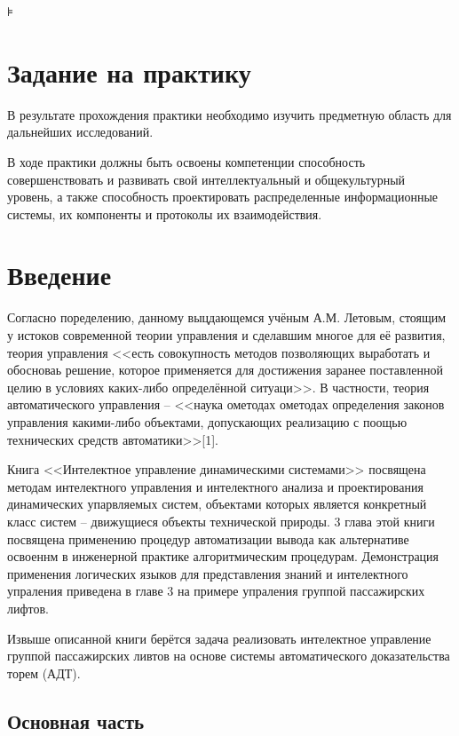
\usepackage{hyperref,xcolor}




\setcounter{page}{2}
\tableofcontents⊧

\newpage
\section{Задание на практику }
В результате прохождения практики необходимо изучить предметную область для дальнейших исследований.

В ходе практики должны быть освоены компетенции способность совершенствовать и развивать свой интеллектуальный и общекультурный уровень, а также способность проектировать распределенные информационные системы, их компоненты и протоколы их взаимодействия.

\newpage
\section{Введение}

Согласно  поределению, данному выцдающемся учёным А.М. Летовым, стоящим у истоков современной теории управления и сделавшим многое для её развития, теория управления <<есть совокупность методов позволяющих выработать и обосноваь решение, которое применяется для достижения заранее поставленной целию в условиях каких-либо определённой ситуаци>>. В частности, теория автоматического управления -- <<наука ометодах ометодах определения законов управления какими-либо объектами, допускающих реализацию с поощью технических средств автоматики>>[1].

    Книга <<Интелектное управление динамическими системами>> посвящена методам интелектного управления и интелектного анализа и проектирования динамических упарвляемых систем, объектами которых является конкретный класс систем -- движущиеся объекты технической природы. 3 глава этой книги посвящена применению процедур автоматизации вывода как альтернативе освоеннм в инженерной практике алгоритмическим процедурам. Демонстрация применения логических языков для представления знаний и интелектного упраления приведена в главе 3 на примере упраления группой пассажирских лифтов. 

    Извыше описанной книги берётся задача реализовать интелектное управление группой пассажирских ливтов на основе системы автоматического доказательства торем (АДТ).

\subsection{Основная часть}

